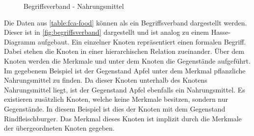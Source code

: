 \begin{figure}[!ht]
    \centering
    \caption{\label{fig:begriffsverband}Begriffsverband - Nahrungsmittel}
\end{figure}

Die Daten aus \autoref{table:fca-food} können als ein Begriffsverband dargestellt werden.
Dieser ist in \autoref{fig:begriffsverband} dargestellt und ist analog zu einem Hasse-Diagramm aufgebaut.
Ein einzelner Knoten repräsentiert einen formalen Begriff.
Dabei stehen die Knoten in einer hierarchischen Relation zueinander.
Über dem Knoten werden die Merkmale und unter dem Knoten die Gegenstände aufgeführt.
Im gegebenem Beispiel ist der Gegenstand Apfel unter dem Merkmal pflanzliche Nahrungsmittel zu finden.
Da dieser Knoten unterhalb des Knotens Nahrungsmittel liegt, ist der Gegenstand Apfel ebenfalls ein Nahrungsmittel.
Es existieren zusätzlich Knoten, welche keine Merkmale besitzen, sondern nur Gegenstände.
In diesem Beispiel ist dies der Knoten mit dem Gegenstand Rindfleischburger.
Das Merkmal dieses Knoten ist implizit durch die Merkmale der übergeordneten Knoten gegeben. \\


